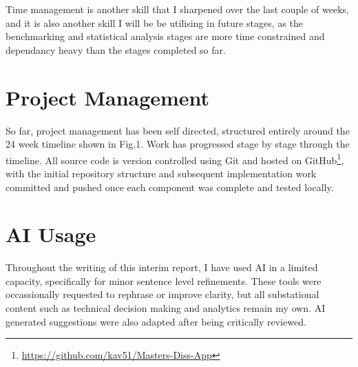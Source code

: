 \documentclass[conference]{IEEEtran}
\begin{document}
\medskip

Time management is another skill that I sharpened over the last couple of weeks, and it is also another skill I will be be utilising in future stages, as the benchmarking and statistical analysis stages are more time constrained and dependancy heavy than the stages completed so far. 

\section{Project Management}

So far, project management has been self directed, structured entirely around the 24 week timeline shown in Fig.1. Work has progressed stage by stage through the timeline. All source code is version controlled using Git and hosted on GitHub\footnote{\url{https://github.com/kav51/Masters-Diss-App}}, with the initial repository structure and subsequent implementation work committed and pushed once each component was complete and tested locally.

\section{AI Usage}

Throughout the writing of this interim report, I have used AI in a limited capacity, specifically for minor sentence level refinements. These tools were occassionally requested to rephrase or improve clarity, but all substational content such as technical decision making and analytics remain my own. AI generated suggestions were also adapted after being critically reviewed. 



\end{document}
